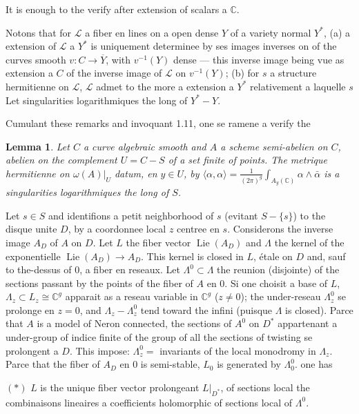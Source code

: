 \documentclass[12pt,a4paper]{article}
\theoremstyle{plain}
\newtheorem{lemma}[theorem]{Lemma}
\theoremstyle{definition}
\theoremstyle{remark}
\DeclareMathOperator{\Lie}{Lie}
\newcommand{\CC}{\mathbb{C}}
\newcommand{\cL}{\mathcal{L}}
\providecommand{\CC}{\mathbb{C}}
\providecommand{\cL}{\mathcal{L}}
\providecommand{\Lie}{\operatorname{Lie}}
\begin{document}
It is enough to the verify after extension of scalars a $\CC$.

Notons that for $\cL$ a fiber en lines on a open dense $Y$ of a variety normal $Y^*$, (a) a extension of $\cL$ a $Y^*$ is uniquement determinee by ses images inverses on of the curves smooth $v : C \to \overline{Y}$, with $v^{-1}(Y)$ dense --- this inverse image being vue as extension a $C$ of the inverse image of $\cL$ on $v^{-1}(Y)$; (b) for $s$ a structure hermitienne on $\cL$, $\cL$ admet to the more a extension a $Y^*$ relativement a laquelle $s$ Let singularities logarithmiques the long of $Y^* - Y$.

Cumulant these remarks and invoquant 1.11, one se ramene a verify the

\begin{lemma}
Let $C$ a curve algebraic smooth and $A$ a scheme semi-abelien on $C$, abelien on the complement $U = C - S$ of a set finite of points. The metrique hermitienne on $\omega(A)|_U$ datum, en $y \in U$, by $\langle \alpha, \alpha \rangle = \frac{1}{(2\pi)^g} \int_{A_y(\CC)} \alpha \wedge \bar{\alpha}$ is a singularities logarithmiques the long of $S$.
\end{lemma}

Let $s \in S$ and identifions a petit neighborhood of $s$ (evitant $S - \{s\}$) to the disque unite $D$, by a coordonnee local $z$ centree en $s$. Considerons the inverse image $A_D$ of $A$ on $D$. Let $L$ the fiber vector $\Lie(A_D)$ and $\Lambda$ the kernel of the exponentielle $\Lie(A_D) \to A_D$. This kernel is closed in $L$, étale on $D$ and, sauf to the-dessus of $0$, a fiber en reseaux. Let $\Lambda^0 \subset \Lambda$ the reunion (disjointe) of the sections passant by the points of the fiber of $A$ en $0$. Si one choisit a base of $L$, $\Lambda_z \subset L_z \cong \CC^g$ apparait as a reseau variable in $\CC^g$ ($z \neq 0$); the under-reseau $\Lambda^0_z$ se prolonge en $z = 0$, and $\Lambda_z - \Lambda^0_z$ tend toward the infini (puisque $\Lambda$ is closed). Parce that $A$ is a model of Neron connected, the sections of $A^0$ on $D^*$ appartenant a under-group of indice finite of the group of all the sections of twisting se prolongent a $D$. This impose: $\Lambda^0_z =$ invariants of the local monodromy in $\Lambda_z$. Parce that the fiber of $A_D$ en $0$ is semi-stable, $L_0$ is generated by $\Lambda^0_0$. one has

$(*)$ $L$ is the unique fiber vector prolongeant $L|_{D^*}$, of sections local the combinaisons lineaires a coefficients holomorphic of sections local of $\Lambda^0$.
\end{document}
